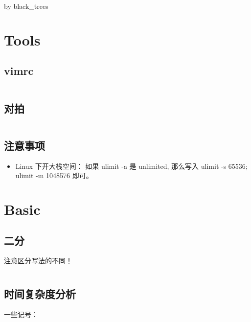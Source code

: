 \documentclass[titlepage, a4paper]{article}
\begin{document}
	\begin{titlepage}
		by black\_trees
	\end{titlepage}
	\begin{multicols}{2}
		\setcounter{tocdepth}{3}
		\begingroup
		\let\cleardoublepage\relax
		\let\clearpage\relax
		\begin{small}
			\begin{spacing}{0.75}
				\tableofcontents
			\end{spacing}
		\end{small}
		\newpage
		\begin{spacing}{0.6}
			\section{Tools}
				\subsection{vimrc}
				 	\inputminted{vim}{src/Tools/.vimrc}
				 \subsection{对拍}
				 	\inputminted{sh}{src/Tools/stress.sh}
				 \subsection{注意事项}
				 	\begin{itemize}
				 		\item Linux 下开大栈空间： 如果 ulimit -a 是 unlimited, 那么写入 ulimit -s 65536; ulimit -m 1048576 即可。
				 	\end{itemize}
			 \section{Basic}
			 	\subsection{二分}
			 		
			 		注意区分写法的不同！
			 	
			 		\inputminted{cpp}{src/Basic/Binary_search.cpp}
			 	\subsection{时间复杂度分析}
			 		一些记号：
			 		

\end{spacing}
\end{multicols}
\end{document}
